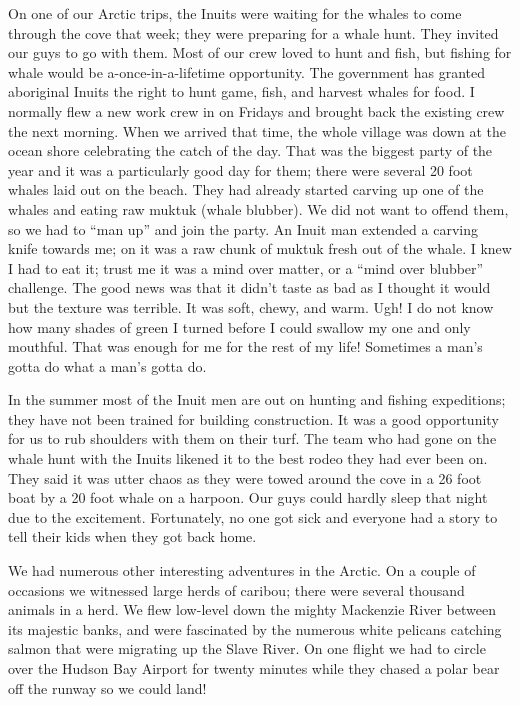 \documentclass[oneside]{book}
\begin{document}
On one of our Arctic trips, the Inuits were waiting for the whales to come through the cove that week; they were preparing for a whale hunt. They invited our guys to go with them. Most of our crew loved to hunt and fish, but fishing for whale would be a-once-in-a-lifetime opportunity. The government has granted aboriginal Inuits the right to hunt game, fish, and harvest whales for food. I normally flew a new work crew in on Fridays and brought back the existing crew the next morning. When we arrived that time, the whole village was down at the ocean shore celebrating the catch of the day. That was the biggest party of the year and it was a particularly good day for them; there were several 20 foot whales laid out on the beach. They had already started carving up one of the whales and eating raw muktuk (whale blubber). We did not want to offend them, so we had to “man up” and join the party. An Inuit man extended a carving knife towards me; on it was a raw chunk of muktuk fresh out of the whale. I knew I had to eat it; trust me it was a mind over matter, or a “mind over blubber” challenge. The good news was that it didn't taste as bad as I thought it would but the texture was terrible. It was soft, chewy, and warm. Ugh! I do not know how many shades of green I turned before I could swallow my one and only mouthful. That was enough for me for the rest of my life! Sometimes a man’s gotta do what a man’s gotta do. 

In the summer most of the Inuit men are out on hunting and fishing expeditions; they have not been trained for building construction. It was a good opportunity for us to rub shoulders with them on their turf. The team who had gone on the whale hunt with the Inuits likened it to the best rodeo they had ever been on. They said it was utter chaos as they were towed around the cove in a 26 foot boat by a 20 foot whale on a harpoon. Our guys could hardly sleep that night due to the excitement. Fortunately, no one got sick and everyone had a story to tell their kids when they got back home.

We had numerous other interesting adventures in the Arctic. On a couple of occasions we witnessed large herds of caribou; there were several thousand animals in a herd. We flew low-level down the mighty Mackenzie River between its majestic banks, and were fascinated by the numerous white pelicans catching salmon that were migrating up the Slave River. On one flight we had to circle over the Hudson Bay Airport for twenty minutes while they chased a polar bear off the runway so we could land! 
\end{document}
